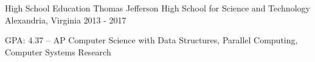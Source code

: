 \begin{cventries}
  \cventry
    {High School Education}
    {Thomas Jefferson High School for Science and Technology}
    {Alexandria, Virginia}
    {2013 - 2017}
    {
      \begin{cvitems}
		\item {GPA: 4.37 -- AP Computer Science with Data Structures, Parallel Computing, Computer Systems Research}
        \vspace{-1em}
      \end{cvitems}
    }
	\vspace{-0.5em}
\end{cventries}
